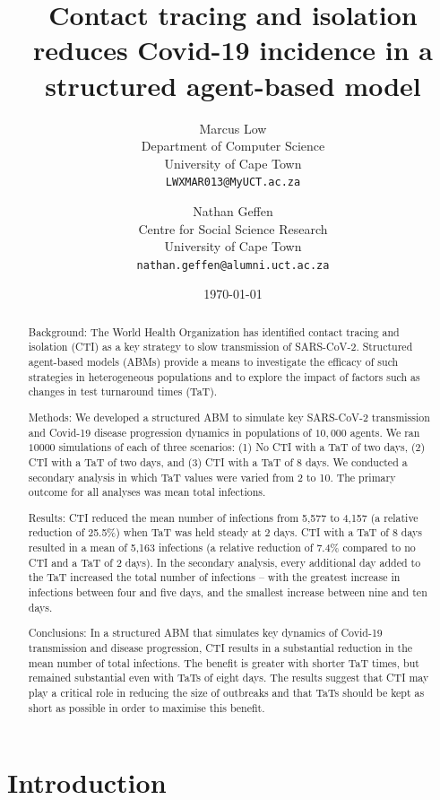 \documentclass{article}
\title{Contact tracing and isolation reduces Covid-19 incidence in a structured agent-based model}
\author{
  Marcus Low \\
  Department of Computer Science \\
  University of Cape Town\\
  \texttt{LWXMAR013@MyUCT.ac.za} \\
  \and
  Nathan Geffen \\
  Centre for Social Science Research \\
  University of Cape Town\\
  \texttt{nathan.geffen@alumni.uct.ac.za}}
\date{\today}
\begin{document}
\maketitle

\begin{abstract}

Background: The World Health Organization has identified contact tracing and
isolation (CTI) as a key strategy to slow transmission of SARS-CoV-2. Structured
agent-based models (ABMs) provide a means to investigate the efficacy of such
strategies in heterogeneous populations and to explore the impact of factors
such as changes in test turnaround times (TaT).

Methods: We developed a structured ABM to simulate key SARS-CoV-2 transmission
and Covid-19 disease progression dynamics in populations of $10,000$ agents. We
ran $10 000$ simulations of each of three scenarios: (1) No CTI with a TaT of
two days, (2) CTI with a TaT of two days, and (3) CTI with a TaT of 8 days. We
conducted a secondary analysis in which TaT values were varied from 2 to 10. The
primary outcome for all analyses was mean total infections.

Results: CTI reduced the mean number of infections from 5,577 to 4,157 (a
relative reduction of 25.5\%) when TaT was held steady at 2 days. CTI with a TaT
of 8 days resulted in a mean of 5,163 infections (a relative reduction of 7.4\%
compared to no CTI and a TaT of 2 days). In the secondary analysis, every
additional day added to the TaT increased the total number of infections – with
the greatest increase in infections between four and five days, and the smallest
increase between nine and ten days.

Conclusions: In a structured ABM that simulates key dynamics of Covid-19
transmission and disease progression, CTI results in a substantial reduction in
the mean number of total infections. The benefit is greater with shorter TaT
times, but remained substantial even with TaTs of eight days. The results
suggest that CTI may play a critical role in reducing the size of outbreaks and
that TaTs should be kept as short as possible in order to maximise this benefit.

\end{abstract}


\section{Introduction}
\end{document}
